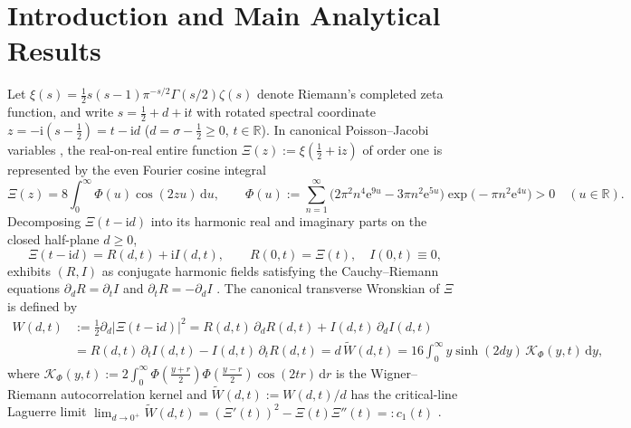 \documentclass[11pt,reqno]{amsart}
\theoremstyle{definition}
\theoremstyle{remark}
\numberwithin{equation}{section}
\newcommand{\dd}{\mathrm{d}}
\newcommand{\ii}{\mathrm{i}}
\newcommand{\ee}{\mathrm{e}}
\begin{document}
\maketitle

\section{Introduction and Main Analytical Results}\label{sec:intro}

Let $\xi(s) = \frac{1}{2}s(s-1)\pi^{-s/2}\Gamma(s/2)\zeta(s)$ denote Riemann's completed zeta function, and write $s = \frac{1}{2} + d + \ii t$ with rotated spectral coordinate $z = -\ii(s - \frac{1}{2}) = t - \ii d$ ($d = \sigma - \frac{1}{2} \ge 0$, $t \in \mathbb{R}$). In canonical Poisson--Jacobi variables \cite{Riemann1859,Polya1926,Titchmarsh1986}, the real-on-real entire function $\Xi(z) := \xi(\frac{1}{2}+\ii z)$ of order one is represented by the even Fourier cosine integral
\begin{equation}\label{eq:Xi-def}
\Xi(z) = 8\int_0^\infty \Phi(u)\cos(2zu)\,\dd u, \qquad \Phi(u) := \sum_{n=1}^\infty \bigl(2\pi^2 n^4 \ee^{9u} - 3\pi n^2 \ee^{5u}\bigr)\exp\bigl(-\pi n^2 \ee^{4u}\bigr) > 0 \quad (u \in \mathbb{R}).
\end{equation}
Decomposing $\Xi(t-\ii d)$ into its harmonic real and imaginary parts on the closed half-plane $d \ge 0$,
\begin{equation}\label{eq:R-I-def}
\Xi(t - \ii d) = R(d,t) + \ii I(d,t), \qquad R(0,t) = \Xi(t), \quad I(0,t) \equiv 0,
\end{equation}
exhibits $(R,I)$ as conjugate harmonic fields satisfying the Cauchy--Riemann equations $\partial_d R = \partial_t I$ and $\partial_t R = -\partial_d I$ \cite{Jensen1913,Polya1926,Speiser1934}. The canonical transverse Wronskian of $\Xi$ is defined by
\begin{align}
W(d,t) &:= \frac{1}{2}\partial_d\bigl|\Xi(t-\ii d)\bigr|^2 = R(d,t)\,\partial_d R(d,t) + I(d,t)\,\partial_d I(d,t) \nonumber\\
&= R(d,t)\,\partial_t I(d,t) - I(d,t)\,\partial_t R(d,t) = d\,\widetilde{W}(d,t) = 16\int_0^\infty y\sinh(2dy)\,\mathcal{K}_\Phi(y,t)\,\dd y, \label{eq:canonical-W}
\end{align}
where $\mathcal{K}_\Phi(y,t) := 2\int_0^\infty \Phi(\frac{y+r}{2})\Phi(\frac{y-r}{2})\cos(2tr)\,\dd r$ is the Wigner--Riemann autocorrelation kernel \cite{Wigner1932} and $\widetilde{W}(d,t) := W(d,t)/d$ has the critical-line Laguerre limit $\lim_{d\to 0^+}\widetilde{W}(d,t) = (\Xi'(t))^2 - \Xi(t)\Xi''(t) =: c_1(t)$ \cite{Laguerre1898,CsordasNorfolkVarga1986}.
\end{document}
